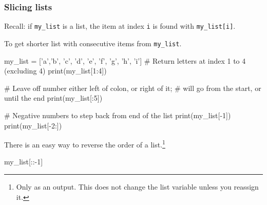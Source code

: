 \documentclass{beamer}
\newenvironment{codeblock}
    {\hfill\begin{beamerboxesrounded}[lower=codecol, width=0.8\textwidth]
    \medskip

    }
    { 
    \end{beamerboxesrounded}\hfill
    }
\theoremstyle{example}
\newcommand{\ct}[1]{\lstinline[language=Python]!#1!}
\newcommand{\ttt}[1]{\texttt{#1}}
\newcommand{\lsitem}[2]{\ttt{{#1}[}\ct{#2}\ttt{]}}
\begin{document}
\begin{frame}[fragile]
\frametitle{Slicing lists}
Recall: if \ttt{my}\ct{_}\ttt{list} is a list, the item at index \ct{i} is found with \ttt{my}\ct{_}\lsitem{list}{i}. 

To get shorter list with consecutive items from \ttt{my}\ct{_}\ttt{list}.

\pause
\begin{codeblock}

\begin{python}
my_list = ['a','b', 'c', 'd', 'e', 'f', 'g', 'h', 'i']
# Return letters at index 1 to 4 (excluding 4)
print(my_list[1:4])

# Leave off number either left of colon, or right of it;
# will go from the start, or until the end
print(my_list[:5])

# Negative numbers to step back from end of the list
print(my_list[-1])
print(my_list[-2:])
\end{python}

\end{codeblock}

\pause
There is an easy way to reverse the order of a list.\footnote{Only as an output. This does not change the list variable unless you reassign it.}

\begin{codeblock}

\begin{python}
my_list[::-1]
\end{python}

\end{codeblock}

\end{frame}
\end{document}
